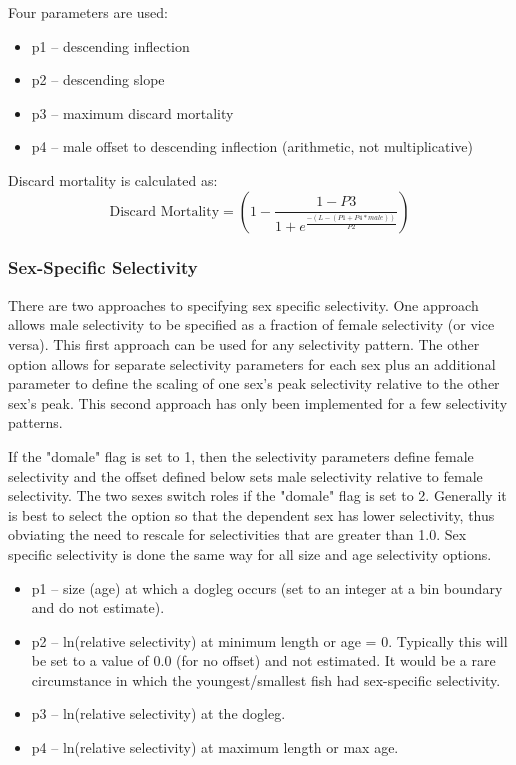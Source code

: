 Four parameters are used:
\begin{itemize}
	\item p1 – descending inflection
	\item p2 – descending slope
	\item p3 – maximum discard mortality
	\item p4 – male offset to descending inflection (arithmetic, not multiplicative)
\end{itemize}

Discard mortality is calculated as:
\begin{equation}
	\text{Discard Mortality} = \left(1 - \frac{1-P3}{1+e^{\frac{-(L-(P1+P4*male))}{P2}}}\right)
\end{equation}

\subsubsection{Sex-Specific Selectivity}
There are two approaches to specifying sex specific selectivity.  One approach allows male selectivity to be specified as a fraction of female selectivity (or vice versa).  This first approach can be used for any selectivity pattern.  The other option allows for separate selectivity parameters for each sex plus an additional parameter to define the scaling of one sex’s peak selectivity relative to the other sex’s peak.  This second approach has only been implemented for a few selectivity patterns.

If the "domale" flag is set to 1, then the selectivity parameters define female selectivity and the offset defined below sets male selectivity relative to female selectivity.  The two sexes switch roles if the "domale" flag is set to 2.  Generally it is best to select the option so that the dependent sex has lower selectivity, thus obviating the need to rescale for selectivities that are greater than 1.0. Sex specific selectivity is done the same way for all size and age selectivity options.
\begin{itemize}
	\item p1 – size (age) at which a dogleg occurs (set to an integer at a bin boundary and do not estimate).
	\item p2 – ln(relative selectivity) at minimum length or age = 0.  Typically this will be set to a value of 0.0 (for no offset) and not estimated.  It would be a rare circumstance in which the youngest/smallest fish had sex-specific selectivity.
	\item p3 – ln(relative selectivity) at the dogleg.
	\item p4 – ln(relative selectivity) at maximum length or max age.
\end{itemize}

